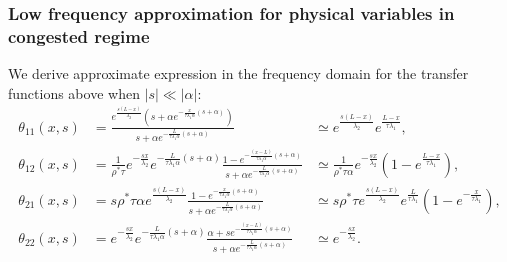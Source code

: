 \documentclass[preprint]{elsarticle}
\begin{document}
\subsubsection{Low frequency approximation for physical variables in congested regime}
We derive approximate expression in the frequency domain for the transfer functions above when $\left|s\right|\ll\left|\alpha\right|$:
\begin{subequations}
\begin{align}
\theta_{11}\left(x,s\right) &=
\frac{
	e^{\frac{s\left(L-x\right)}{\lambda_{2}}}
	\left(
		s
		+
		\alpha
		e^{
			-\frac{x}{\tau\lambda_{1}\alpha}
			\left(s+\alpha\right)
		}
	\right)
}{
	s
	+
	\alpha
	e^{
		-\frac{L}{\tau\lambda_{1}\alpha}
		\left(s+\alpha\right)
	}
}
&\simeq
e^{\frac{s\left(L-x\right)}{\lambda_{2}}}
e^{\frac{L-x}{\tau\lambda_{1}}},\\
\theta_{12}\left(x,s\right) &=
\frac{1}{\rho^{*}\tau}
e^{-\frac{sx}{\lambda_{2}}}
e^{-\frac{L}{\tau\lambda_{1}\alpha}\left(s+\alpha\right)}
\frac{
	1 - e^{-\frac{\left(x-L\right)}{\tau\lambda_{1}\alpha}\left(s+\alpha\right)}
}{
	s
	+
	\alpha
	e^{
		-\frac{L}{\tau\lambda_{1}\alpha}
		\left(s+\alpha\right)
	}
}
&\simeq
\frac{1}{\rho^{*}\tau\alpha}
e^{-\frac{sx}{\lambda_{2}}}
\left(
	1 - e^{\frac{L-x}{\tau\lambda_{1}}}
\right),\\
\theta_{21}\left(x,s\right) &=
s \rho^{*}\tau\alpha
e^{\frac{s\left(L-x\right)}{\lambda_{2}}}
\frac{
	1 - 
	e^{-\frac{x}{\tau\lambda_{1}\alpha}\left(s+\alpha\right)}
}{
	s
	+
	\alpha
	e^{
		-\frac{L}{\tau\lambda_{1}\alpha}
		\left(s+\alpha\right)
	}
}
&\simeq
s \rho^{*}\tau
e^{\frac{s\left(L-x\right)}{\lambda_{2}}}
e^{\frac{L}{\tau\lambda_{1}}}
\left(
	1 - e^{-\frac{x}{\tau\lambda_{1}}}
\right),\\
\theta_{22}\left(x,s\right) &=
e^{-\frac{sx}{\lambda_{2}}}
e^{-\frac{L}{\tau\lambda_{1}\alpha}\left(s+\alpha\right)}
\frac{
	\alpha + se^{-\frac{\left(x-L\right)}{\tau\lambda_{1}\alpha}\left(s+\alpha\right)}
}{
	s
	+
	\alpha
	e^{
		-\frac{L}{\tau\lambda_{1}\alpha}
		\left(s+\alpha\right)
	}
}
&\simeq
e^{-\frac{sx}{\lambda_{2}}}.
\end{align}
\end{subequations}
\end{document}

